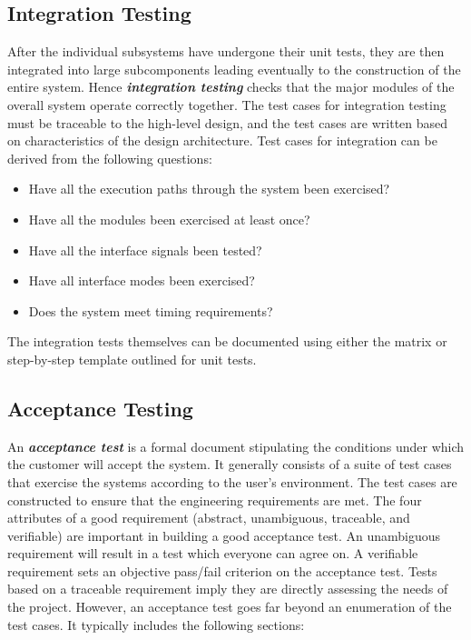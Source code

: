 \subsection{Integration Testing}
\label{subsection:integration-testing}

After the individual subsystems have undergone their unit tests, they
are then integrated into large subcomponents leading eventually to the
construction of the entire system. Hence \emph{\textbf{integration
testing}} checks that the major modules of the overall system operate
correctly together. The test cases for integration testing must be
traceable to the high-level design, and the test cases are written based
on characteristics of the design architecture. Test cases for
integration can be derived from the following questions:

\begin{itemize}
\item
  Have all the execution paths through the system been exercised?
\item
  Have all the modules been exercised at least once?
\item
  Have all the interface signals been tested?
\item
  Have all interface modes been exercised?
\item
  Does the system meet timing requirements?
\end{itemize}

The integration tests themselves can be documented using either the
matrix or step-by-step template outlined for unit tests.

\subsection{Acceptance Testing}
\label{subsection:acceptance-testing}

An \emph{\textbf{acceptance test}} is a formal document stipulating the
conditions under which the customer will accept the system. It generally
consists of a suite of test cases that exercise the systems according to
the user's environment. The test cases are constructed to ensure that
the engineering requirements are met. The four attributes of a good
requirement (abstract, unambiguous, traceable, and verifiable) are
important in building a good acceptance test. An unambiguous requirement
will result in a test which everyone can agree on. A verifiable
requirement sets an objective pass/fail criterion on the acceptance
test. Tests based on a traceable requirement imply they are directly
assessing the needs of the project. However, an acceptance test goes far
beyond an enumeration of the test cases. It typically includes the
following sections:

